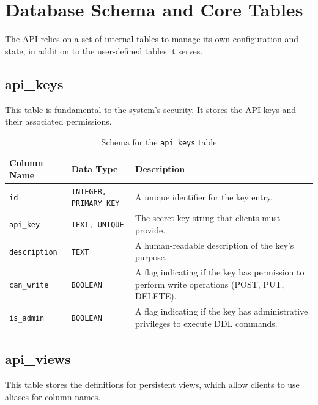 \documentclass[12pt, a4paper]{report}
\begin{document}
\section{Database Schema and Core Tables}
The API relies on a set of internal tables to manage its own configuration and state, in addition to the user-defined tables it serves.

\subsection*{api\_keys}
This table is fundamental to the system's security. It stores the API keys and their associated permissions.

\begin{table}[h!] %
    \centering %
    \caption{Schema for the \lstinline|api_keys| table} %
    \label{tab:api_keys} %
    \begin{tabularx}{\textwidth}{@{} l l X @{}}
        \toprule
        \textbf{Column Name} & \textbf{Data Type} & \textbf{Description} \\
        \midrule
        \lstinline|id| & \texttt{INTEGER, PRIMARY KEY} & A unique identifier for the key entry. \\
        \lstinline|api_key| & \texttt{TEXT, UNIQUE} & The secret key string that clients must provide. \\
        \lstinline|description| & \texttt{TEXT} & A human-readable description of the key's purpose. \\
        \lstinline|can_write| & \texttt{BOOLEAN} & A flag indicating if the key has permission to perform write operations (POST, PUT, DELETE). \\
        \lstinline|is_admin| & \texttt{BOOLEAN} & A flag indicating if the key has administrative privileges to execute DDL commands. \\
        \bottomrule
    \end{tabularx}
\end{table} %


\subsection*{api\_views}
This table stores the definitions for persistent views, which allow clients to use aliases for column names.
\end{document}
